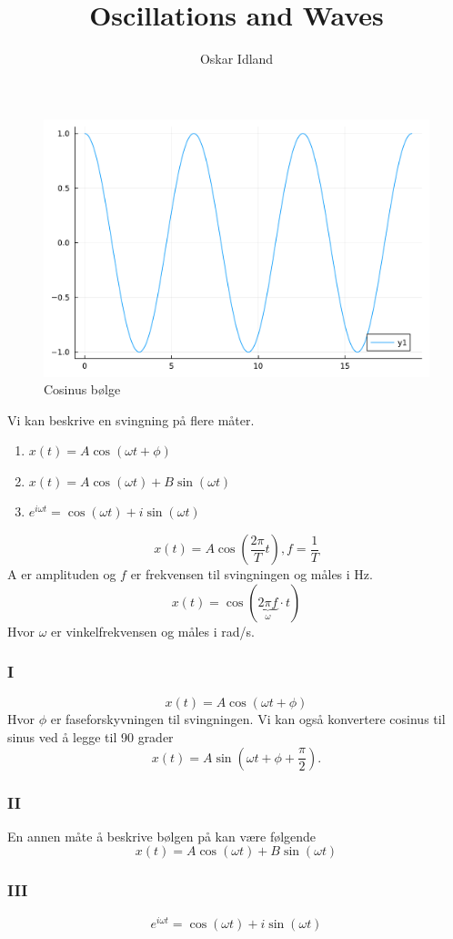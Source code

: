 \documentclass{article}
\author{Oskar Idland}
\title{Oscillations and Waves}
\date{}
\begin{document}
\maketitle
\newpage
\begin{figure}[h!]
  \centering
  \includegraphics[scale = .5]{Figures/cosine_curve.pdf}
  \caption{Cosinus bølge}
  \label{fig: cosine_curve}
\end{figure}
Vi kan beskrive en svingning på flere måter.

\begin{enumerate}[I]
\item  $x(t) = A \cos (ωt + ϕ)$
\item  $x(t) = A\cos (ωt) + B \sin (ωt)$
\item  $e^{iωt} = \cos (ωt) + i \sin (ωt)$
\end{enumerate}


\[
x(t) = A \cos (\frac{2π}{T}t), f = \frac{1}{T}
\]
A er amplituden og $f$ er frekvensen til svingningen og måles i Hz. 
\[
x(t) = \cos (\underbrace{2πf}_{\omega} ⋅ t )
\]
Hvor $ω$ er vinkelfrekvensen og måles i rad/s.
        
\subsubsection*{I}
\[
x(t) = A \cos (ωt + ϕ)
\]
Hvor $ϕ$ er faseforskyvningen til svingningen. Vi kan også konvertere cosinus til sinus ved å legge til 90 grader 
\[
x(t) = A \sin (ωt + ϕ + \frac{π}{2}).
\]

\subsubsection*{II}
  
En annen måte å beskrive bølgen på kan være følgende
\[
x(t) = A\cos (ωt) + B \sin (ωt)
\]

\subsubsection*{III}
\[
e^{iωt} = \cos (ωt) + i \sin (ωt)
\]
\end{document}
